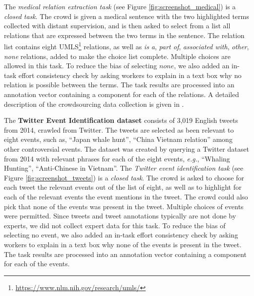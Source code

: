 The \emph{medical relation extraction task} (see Figure \ref{fig:screenshot_medical}) is a \textit{closed task}. The crowd is given a medical sentence with the two highlighted terms collected with distant supervision, and is then asked to select from a list all relations that are expressed between the two terms in the sentence. The relation list contains eight UMLS\footnote{\url{https://www.nlm.nih.gov/research/umls/}} relations, as well as \textit{is a}, \textit{part of}, \textit{associated with}, \textit{other}, \textit{none} relations, added to make the choice list complete. Multiple choices are allowed in this task. To reduce the bias of selecting $none$, we also added an in-task effort consistency check by asking workers to explain in a text box why no relation is possible between the terms. The task results are processed into an annotation vector containing a component for each of the relations. A detailed description of the crowdsourcing data collection is given in \cite{DBLP:journals/corr/DumitracheAW17}.

The \textbf{Twitter Event Identification dataset} consists of 3,019 English tweets from 2014, crawled from Twitter. The tweets are selected as been relevant to eight events, such as, ``Japan whale hunt'', ``China Vietnam relation'' among other controversial events. The dataset was created by querying a Twitter dataset from 2014 with relevant phrases for each of the eight events, \emph{e.g.}, ``Whaling Hunting'', ``Anti-Chinese in Vietnam''. The \emph{Twitter event identification task} (see Figure \ref{fig:screenshot_tweets}) is a \textit{closed task}. The crowd is asked to choose for each tweet the relevant events out of the list of eight, as well as to highlight for each of the relevant events the event mentions in the tweet. The crowd could also pick that none of the events was present in the tweet. Multiple choices of events were permitted. Since tweets and tweet annotations typically are not done by experts, we did not collect expert data for this task. To reduce the bias of selecting no event, we also added an in-task effort consistency check by asking workers to explain in a text box why none of the events is present in the tweet. The task results are processed into an annotation vector containing a component for each of the events.

